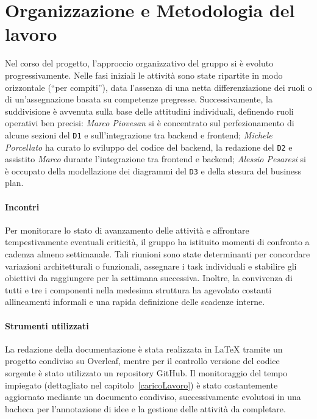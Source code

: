 \section{Organizzazione e Metodologia del lavoro}

Nel corso del progetto, l'approccio organizzativo del gruppo si è evoluto progressivamente. Nelle fasi iniziali le attività sono state ripartite in modo orizzontale (``per compiti''), data l'assenza di una netta differenziazione dei ruoli o di un'assegnazione basata su competenze pregresse. Successivamente, la suddivisione è avvenuta sulla base delle attitudini individuali, definendo ruoli operativi ben precisi: \textit{Marco Piovesan} si è concentrato sul perfezionamento di alcune sezioni del \texttt{D1} e sull'integrazione tra backend e frontend; \textit{Michele Porcellato} ha curato lo sviluppo del codice del backend, la redazione del \texttt{D2} e assistito \textit{Marco} durante l'integrazione tra frontend e backend; \textit{Alessio Pesaresi} si è occupato della modellazione dei diagrammi del \texttt{D3} e della stesura del business plan.

\paragraph{Incontri}
    Per monitorare lo stato di avanzamento delle attività e affrontare tempestivamente eventuali criticità, il gruppo ha istituito momenti di confronto a cadenza almeno settimanale. Tali riunioni sono state determinanti per concordare variazioni architetturali o funzionali, assegnare i task individuali e stabilire gli obiettivi da raggiungere per la settimana successiva. Inoltre, la convivenza di tutti e tre i componenti nella medesima struttura ha agevolato costanti allineamenti informali e una rapida definizione delle scadenze interne.

\paragraph{Strumenti utilizzati}
    La redazione della documentazione è stata realizzata in \LaTeX{} tramite un progetto condiviso su Overleaf, mentre per il controllo versione del codice sorgente è stato utilizzato un repository GitHub. Il monitoraggio del tempo impiegato (dettagliato nel capitolo~\ref{caricoLavoro}) è stato costantemente aggiornato mediante un documento condiviso, successivamente evolutosi in una bacheca per l'annotazione di idee e la gestione delle attività da completare.